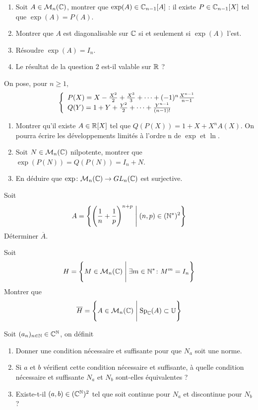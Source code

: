 \documentclass[12pt]{article}
\begin{document}
\begin{exercise}
	\phantom{}
	\begin{enumerate}
		\item Soit $A\in\mathcal{M}_{n}(\mathbb{C})$, montrer que $\exp(A)\in\mathbb{C}_{n-1}[A]$ : il existe $P\in\mathbb{C}_{n-1}[X]$ tel que $\exp(A)=P(A)$.
		\item Montrer que $A$ est diagonalisable sur $\mathbb{C}$ si et seulement si $\exp(A)$ l'est.
		\item Résoudre $\exp(A)=I_{n}$.
		\item Le résultat de la question 2 est-il valable sur $\mathbb{R}$ ?
	\end{enumerate}
\end{exercise}

\begin{exercise}
	On pose, pour $n\geqslant1$,
	$$
	\left\{
		\begin{array}[]{l}
			P(X)=X-\frac{X^{2}}{2}+\frac{X^{3}}{3}+\dots+(-1)^{n}\frac{X^{n-1}}{n-1}\\
			Q(Y)=1+Y+\frac{Y^{2}}{2}+\dots+\frac{Y^{n-1}}{(n-1)!}
		\end{array}
	\right.
	$$
	\begin{enumerate}
		\item Montrer qu'il existe $A\in\mathbb{R}[X]$ tel que $Q(P(X))=1+X+X^{n}A(X)$. On pourra écrire les développements limités à l'ordre n de $\exp$ et $\ln$.
		\item Soit $N\in\mathcal{M}_{n}(\mathbb{C})$ nilpotente, montrer que $\exp(P(N))=Q(P(N))=I_{n}+N$.
		\item En déduire que $\exp\colon\mathcal{M}_{n}(\mathbb{C})\to GL_{n}(\mathbb{C})$ est surjective.
	\end{enumerate}
\end{exercise}

\begin{exercise}
	Soit 
	$$A=\Biggl\{\Biggl(\frac{1}{n}+\frac{1}{p}\Biggr)^{n+p}\Biggm|(n,p)\in(\mathbb{N}^{*})^{2}\Biggr\}$$
	Déterminer $\overline{A}$.
\end{exercise}

\begin{exercise}
	Soit 
	$$H=\Biggl\{M\in\mathcal{M}_{n}(\mathbb{C})\Biggm|\exists m\in\mathbb{N}^{*}\colon M^{m}=I_{n}\Biggr\}$$
	Montrer que 
	$$\overline{H}=\Biggl\{A\in\mathcal{M}_{n}(\mathbb{C})\Biggm|\operatorname{Sp}_{\mathbb{C}}(A)\subset\mathbb{U}\Biggr\}$$
\end{exercise}

\begin{exercise}
	Soit $(a_{n})_{n\in\mathbb{N}}\in\mathbb{C}^{\mathbb{N}}$, on définit 
	\begin{enumerate}
		\item Donner une condition nécessaire et suffisante pour que $N_{a}$ soit une norme.
		\item Si $a$ et $b$ vérifient cette condition nécessaire et suffisante, à quelle condition nécessaire et suffisante $N_{a}$ et $N_{b}$ sont-elles équivalentes ?
		\item Existe-t-il $(a,b)\in(\mathbb{C}^{\mathbb{N}})^{2}$ tel que  soit continue pour $N_{a}$ et discontinue pour $N_{b}$ ?
	\end{enumerate}
\end{exercise}
\end{document}
